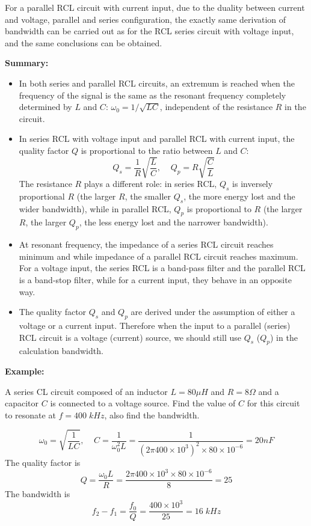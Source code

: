 For a parallel RCL circuit with current input, due to the duality between
current and voltage, parallel and series configuration, the exactly same 
derivation of bandwidth can be carried out as for the RCL series circuit
with voltage input, and the same conclusions can be obtained. 


{\bf Summary:}
\begin{itemize}
\item In both series and parallel RCL circuits, an extremum is reached
when the frequency of the signal is the same as the resonant frequency
completely determined by $L$ and $C$: $\omega_0=1/\sqrt{LC}$, independent
of the resistance $R$ in the circuit.

\item In series RCL with voltage input and parallel RCL with current input, 
the quality factor $Q$ is proportional to the ratio between $L$ and $C$:
\[ Q_s=\frac{1}{R}\sqrt{\frac{L}{C}},\;\;\;\;Q_p=R\sqrt{\frac{C}{L}} \]
The resistance $R$ plays a different role: in series RCL, $Q_s$ is inversely
proportional $R$ (the larger $R$, the smaller $Q_s$, the more energy lost 
and the wider bandwidth), while in parallel RCL, $Q_p$ is proportional to
$R$ (the larger $R$, the larger $Q_p$, the less energy lost and the narrower
bandwidth).

\item At resonant frequency, the impedance of a series RCL circuit reaches
minimum and while impedance of a parallel RCL circuit reaches maximum. For
a voltage input, the series RCL is a band-pass filter and the parallel RCL 
is a band-stop filter, while for a current input, they behave in an opposite
way.

\item The quality factor $Q_s$ and $Q_p$ are derived under the assumption 
of either a voltage or a current input. Therefore when the input to a 
parallel (series) RCL circuit is a voltage (current) source, we should 
still use $Q_s$ ($Q_p$) in the calculation bandwidth. 

\end{itemize}

{\bf Example:}

A series CL circuit composed of an inductor $L=80\mu H$ and $R=8\Omega$
and a capacitor $C$ is connected to a voltage source. Find the value of 
$C$ for this circuit to resonate at $f=400\;kHz$, also find the bandwidth.

\[	\omega_0=\sqrt{\frac{1}{LC}},\;\;\;\;
C=\frac{1}{\omega_0^2 L}=\frac{1}{(2\pi 400\times 10^3)^2\times 80\times 10^{-6}}
=20nF	\]
The quality factor is
\[
Q=\frac{\omega_0 L}{R}=\frac{2\pi 400\times 10^3\times 80\times 10^{-6}}{8}=25
\]
The bandwidth is
\[	f_2-f_1=\frac{f_0}{Q}=\frac{400\times 10^3}{25}=16\;kHz	\]

